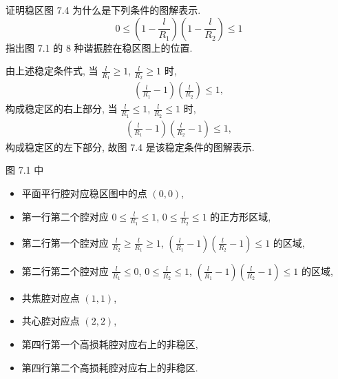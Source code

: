 \documentclass[twoside]{note}
\begin{document}
\begin{exe}
    证明稳区图 7.4 为什么是下列条件的图解表示.
    \[
        0\leq\left(1-\frac{l}{R_1}\right)\left(1-\frac{l}{R_2}\right)\leq 1
    \]
    指出图 7.1 的 8 种谐振腔在稳区图上的位置.
\end{exe}
\begin{sol}
    由上述稳定条件式, 当 $\frac{l}{R_1}\geq 1$, $\frac{l}{R_2}\geq 1$ 时,
    \begin{align}
        \left(\frac{l}{R_1}-1\right)\left(\frac{l}{R_2}\right)\leq 1,
    \end{align}
    构成稳定区的右上部分,
    当 $\frac{l}{R_1}\leq 1$, $\frac{l}{R_2}\leq 1$ 时,
    \begin{align}
        \left(\frac{l}{R_1}-1\right)\left(\frac{l}{R_2}-1\right)\leq 1,
    \end{align}
    构成稳定区的左下部分,
    故图 7.4 是该稳定条件的图解表示.

    图 7.1 中
    \begin{itemize}
        \item 平面平行腔对应稳区图中的点 $(0,0)$,
        \item 第一行第二个腔对应 $0\leq\frac{l}{R_1}\leq 1$, $0\leq\frac{l}{R_2}\leq 1$ 的正方形区域,
        \item 第二行第一个腔对应 $\frac{l}{R_2}\geq\frac{l}{R_1}\geq 1$, $\left(\frac{l}{R_1}-1\right)\left(\frac{l}{R_2}-1\right)\leq 1$ 的区域,
        \item 第二行第二个腔对应 $\frac{l}{R_1}\leq 0$, $0\leq\frac{l}{R_2}\leq 1$, $\left(\frac{l}{R_1}-1\right)\left(\frac{l}{R_2}-1\right)\leq 1$ 的区域,
        \item 共焦腔对应点 $(1,1)$,
        \item 共心腔对应点 $(2,2)$,
        \item 第四行第一个高损耗腔对应右上的非稳区,
        \item 第四行第二个高损耗腔对应右上的非稳区.
    \end{itemize}
\end{sol}
\end{document}
